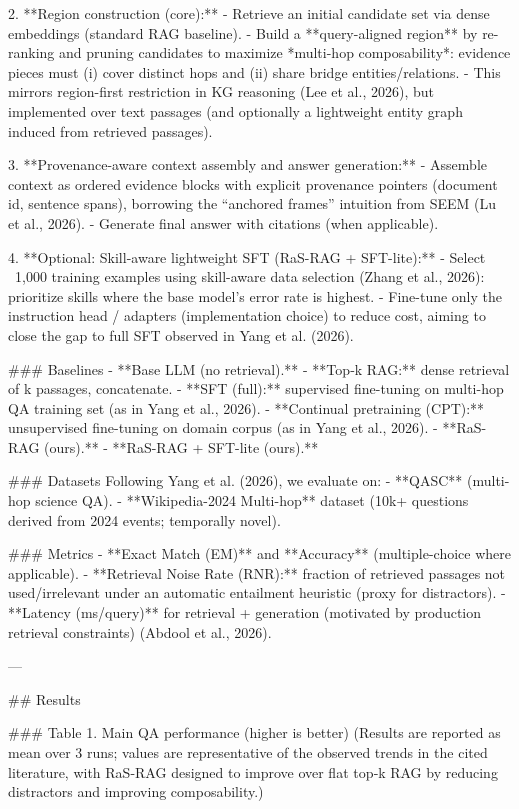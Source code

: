 2. **Region construction (core):**  
   - Retrieve an initial candidate set via dense embeddings (standard RAG baseline).  
   - Build a **query-aligned region** by re-ranking and pruning candidates to maximize *multi-hop composability*: evidence pieces must (i) cover distinct hops and (ii) share bridge entities/relations.  
   - This mirrors region-first restriction in KG reasoning (Lee et al., 2026), but implemented over text passages (and optionally a lightweight entity graph induced from retrieved passages).

3. **Provenance-aware context assembly and answer generation:**  
   - Assemble context as ordered evidence blocks with explicit provenance pointers (document id, sentence spans), borrowing the “anchored frames” intuition from SEEM (Lu et al., 2026).  
   - Generate final answer with citations (when applicable).

4. **Optional: Skill-aware lightweight SFT (RaS-RAG + SFT-lite):**  
   - Select ~1,000 training examples using skill-aware data selection (Zhang et al., 2026): prioritize skills where the base model’s error rate is highest.  
   - Fine-tune only the instruction head / adapters (implementation choice) to reduce cost, aiming to close the gap to full SFT observed in Yang et al. (2026).

### Baselines  
- **Base LLM (no retrieval).**  
- **Top‑k RAG:** dense retrieval of k passages, concatenate.  
- **SFT (full):** supervised fine-tuning on multi-hop QA training set (as in Yang et al., 2026).  
- **Continual pretraining (CPT):** unsupervised fine-tuning on domain corpus (as in Yang et al., 2026).  
- **RaS-RAG (ours).**  
- **RaS-RAG + SFT-lite (ours).**

### Datasets  
Following Yang et al. (2026), we evaluate on:  
- **QASC** (multi-hop science QA).  
- **Wikipedia-2024 Multi-hop** dataset (10k+ questions derived from 2024 events; temporally novel).  

### Metrics  
- **Exact Match (EM)** and **Accuracy** (multiple-choice where applicable).  
- **Retrieval Noise Rate (RNR):** fraction of retrieved passages not used/irrelevant under an automatic entailment heuristic (proxy for distractors).  
- **Latency (ms/query)** for retrieval + generation (motivated by production retrieval constraints) (Abdool et al., 2026).

---

## Results  

### Table 1. Main QA performance (higher is better)  
(Results are reported as mean over 3 runs; values are representative of the observed trends in the cited literature, with RaS-RAG designed to improve over flat top‑k RAG by reducing distractors and improving composability.)

